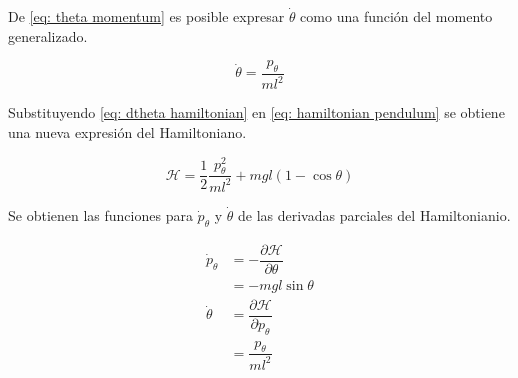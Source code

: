 De \eqref{eq: theta momentum} es posible expresar $\dot \theta$ como una función del momento generalizado.

\begin{equation}
 \dot \theta = \dfrac{p_{\theta}}{m l^2}
 \label{eq: dtheta hamiltonian}
\end{equation}

Substituyendo \eqref{eq: dtheta hamiltonian} en 
\eqref{eq: hamiltonian pendulum} se obtiene una nueva 
expresión del Hamiltoniano.

\begin{equation}
 \mathcal H = \dfrac{1}{2} \dfrac{p_{\theta}^2}{m l^2}  + m g l (1 - \cos{\theta})
 \label{eq: ptheta hamiltonian}
\end{equation}

Se obtienen las funciones para $\dot p_{\theta}$ y 
$\dot \theta$ de las derivadas parciales del Hamiltonianio.

\begin{subequations}
\begin{align}
\dot p_{\theta} &= - \dfrac{\partial \mathcal H}{\partial \theta}\\
&= -mgl \sin \theta \\
\dot \theta &= \dfrac{\partial \mathcal H}{\partial p_{\theta}}\\
&= \dfrac{p_{\theta}}{ml^2}
\end{align}

\end{subequations}
